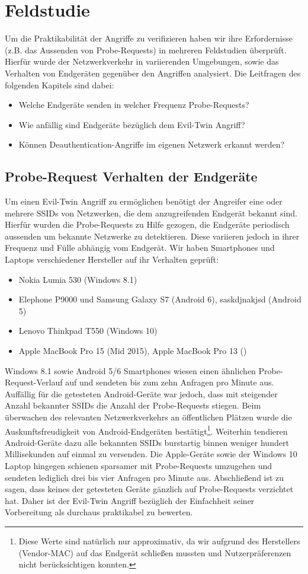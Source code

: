\section{Feldstudie}
Um die Praktikabilität der Angriffe zu verifizieren haben wir ihre Erfordernisse (z.B. das Aussenden von Probe-Requests) in mehreren Feldstudien überprüft.
Hierfür wurde der Netzwerkverkehr in variierenden Umgebungen, sowie das Verhalten von Endgeräten gegenüber den Angriffen analysiert.
Die Leitfragen des folgenden Kapitels sind dabei:
\begin{itemize}
	\item Welche Endgeräte senden in welcher Frequenz Probe-Requests?
	\item Wie anfällig sind Endgeräte bezüglich dem Evil-Twin Angriff?
	\item Können Deauthentication-Angriffe im eigenen Netzwerk erkannt werden?
\end{itemize}

\subsection{Probe-Request Verhalten der Endgeräte}
Um einen Evil-Twin Angriff zu ermöglichen benötigt der Angreifer eine oder mehrere SSIDs von Netzwerken, die dem anzugreifenden Endgerät bekannt sind.
Hierfür wurden die Probe-Requests zu Hilfe gezogen, die Endgeräte periodisch aussenden um bekannte Netzwerke zu detektieren.
Diese variieren jedoch in ihrer Frequenz und Fülle abhängig vom Endgerät.
Wir haben Smartphones und Laptops verschiedener Hersteller auf ihr Verhalten geprüft:
\begin{itemize}
	\item Nokia Lumia 530 (Windows 8.1)
	\item Elephone P9000 und Samsung Galaxy S7 (Android 6), saskdjnakjsd (Android 5) %
	\item Lenovo Thinkpad T550 (Windows 10)
	\item Apple MacBook Pro 15 (Mid 2015), Apple MacBook Pro 13 () %
\end{itemize}
Windows 8.1 sowie Android 5/6 Smartphones wiesen einen ähnlichen Probe-Request-Verlauf auf und sendeten bis zum zehn Anfragen pro Minute aus.
Auffällig für die getesteten Android-Geräte war jedoch, dass mit steigender Anzahl bekannter SSIDs die Anzahl der Probe-Requests stiegen.
Beim überwachen des relevanten Netzwerkverkehrs an öffentlichen Plätzen wurde die Auskunftsfreudigkeit von Android-Endgeräten bestätigt\footnote{Diese Werte sind natürlich nur approximativ, da wir aufgrund des Herstellers (Vendor-MAC) auf das Endgerät schließen mussten und Nutzerpräferenzen nicht berücksichtigen konnten.}. %
Weiterhin tendieren Android-Geräte dazu alle bekannten SSIDs burstartig binnen weniger hundert Millisekunden auf einmal zu versenden.
Die Apple-Geräte sowie der Windows 10 Laptop hingegen schienen sparsamer mit Probe-Requests umzugehen und sendeten lediglich drei bis vier Anfragen pro Minute aus.
Abschließend ist zu sagen, dass keines der getesteten Geräte gänzlich auf Probe-Requests verzichtet hat.
Daher ist der Evil-Twin Angriff bezüglich der Einfachheit seiner Vorbereitung als durchaus praktikabel zu bewerten.

